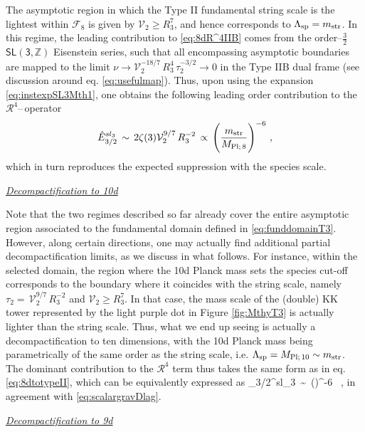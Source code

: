 The asymptotic region in which the Type II fundamental string scale is the lightest within $\mathscr{F}_8$ is given by $\mathcal{V}_2 \geq R_3^7$, and hence corresponds to $\Lambda_{\text{sp}}=m_{\text{str}}$. In this regime, the leading contribution to \eqref{eq:8dR^4IIB} comes from the order--$\frac32$ $\mathsf{SL(3,\mathbb{Z})}$ Eisenstein series, such that all encompassing asymptotic boundaries are mapped to the limit $\nu \to \mathcal{V}_2^{-18/7}\, R_3^4\, \tau_2^{-3/2}\to 0$ in the Type IIB dual frame (see discussion around eq. \eqref{eq:usefulmap}). Thus, upon using the expansion \eqref{eq:instexpSL3Mth1}, one obtains the following leading order contribution to the $\mathcal{R}^4$--\,operator
%
\begin{align}
\label{eq:8dtotypeII}
	\hat{E}_{3/2}^{sl_3}\, \sim\, 2\zeta(3) \mathcal{V}_2^{9/7}\, R_3^{-2}\, \propto\, \left(\frac{m_{\text{str}}}{M_{\rm Pl;\, 8}}\right)^{-6}\, ,
\end{align}
%
which in turn reproduces the expected suppression with the species scale.
\newline

\underline{\textit{Decompactification to 10d}}
\newline

Note that the two regimes described so far already cover the entire asymptotic region associated to the fundamental domain defined in \eqref{eq:funddomainT3}. However, along certain directions, one may actually find additional partial decompactification limits, as we discuss in what follows. For instance, within the selected domain, the region where the 10d Planck mass sets the species cut-off corresponds to the boundary where it coincides with the string scale, namely $\tau_2=\, \mathcal{V}_2^{9/7}\, R_3^{-2}$ and $\mathcal{V}_2 \geq R_3^7$. In that case, the mass scale of the (double) KK tower represented by the light purple dot in Figure \ref{fig:MthyT3} is actually lighter than the string scale. Thus, what we end up seeing is actually a decompactification to ten dimensions, with the 10d Planck mass being parametrically of the same order as the string scale, i.e. $\Lambda_{\text{sp}}=M_{\rm Pl;\, 10}\sim m_{\text{str}}$. The dominant contribution to the $\mathcal{R}^4$ term thus takes the same form as in eq. \eqref{eq:8dtotypeII}, which can be equivalently expressed as
%
\beq
{}_{3/2}^{sl_3}\, \sim\, \left(\right)^{-6} \, ,
\eeq
%
in agreement with \eqref{eq:scalargravDlag}.
\newline

\underline{\textit{Decompactification to 9d}}
\newline

